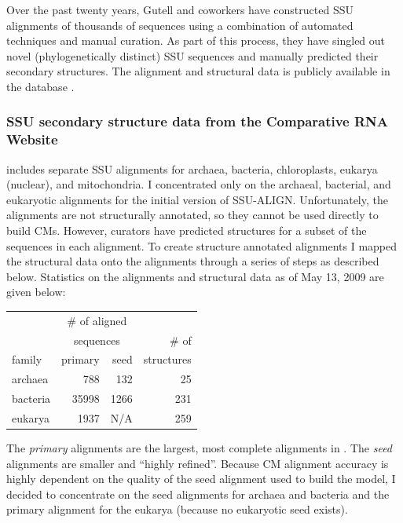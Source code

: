 Over the past twenty years, Gutell and coworkers have constructed SSU
alignments of thousands of sequences using a combination of automated
techniques and manual curation. As part of this process, they have
singled out novel (phylogenetically distinct) SSU sequences and
manually predicted their secondary structures. The alignment and
structural data is publicly available in the  database
\cite{CannoneGutell02}. 

\subsubsection{SSU secondary structure data from the Comparative RNA
  Website} 

 includes separate SSU alignments for archaea, bacteria,
chloroplasts, eukarya (nuclear), and mitochondria. I concentrated only
on the archaeal, bacterial, and eukaryotic alignments for the initial
version of SSU-ALIGN.  Unfortunately, the  alignments
are not structurally annotated, so they cannot be used directly to
build CMs. However,  curators have predicted structures for a
subset of the sequences in each alignment.  To create structure
annotated alignments I mapped the structural data onto the alignments
through a series of steps as described below.  Statistics on the
 alignments and structural data as of May 13, 2009 are given
below:

\begin{center}
\begin{tabular}{l|rr|r}
       & \multicolumn{2}{c|}{\# of aligned}& \\
       & \multicolumn{2}{c|}{sequences}    & \# of \\ \cline {2-3}
family & primary & seed                   & structures \\ \hline
archaea&     788 &  132                   & 25 \\
bacteria&  35998 & 1266                   & 231 \\
eukarya&    1937 & N/A                    & 259 \\
\end{tabular}
\end{center}

The {\em primary} alignments are the largest, most complete alignments
in . The {\em seed} alignments are smaller and ``highly
refined''. Because CM alignment accuracy is highly dependent on the
quality of the seed alignment used to build the model, I decided to
concentrate on the seed alignments for archaea and bacteria and the
primary alignment for the eukarya (because no eukaryotic seed exists).

